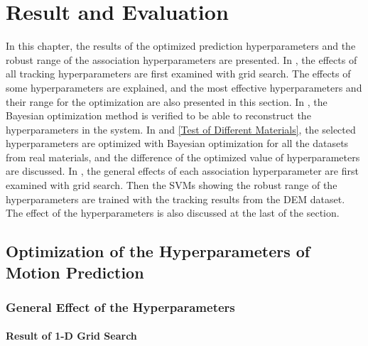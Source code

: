 \chapter{Result and Evaluation}

In this chapter, the results of the optimized prediction hyperparameters and the robust range of the association hyperparameters are presented. In , the effects of all tracking hyperparameters are first examined with grid search. The effects of some hyperparameters are explained, and the most effective hyperparameters and their range for the optimization are also presented in this section. In , the Bayesian optimization method is verified to be able to reconstruct the hyperparameters in the system. In  and \ref{Test of Different Materials}, the selected hyperparameters are optimized with Bayesian optimization for all the datasets from real materials, and the difference of the optimized value of hyperparameters are discussed. In , the general effects of each association hyperparameter are first examined with grid search. Then the SVMs showing the robust range of the hyperparameters are trained with the tracking results from the DEM dataset. The effect of the hyperparameters is also discussed at the last of the section.

\section{Optimization of the Hyperparameters of Motion Prediction}
\label{opt pred}
\subsection{General Effect of the Hyperparameters}

\label{1d}
\subsubsection{Result of 1-D Grid Search}

